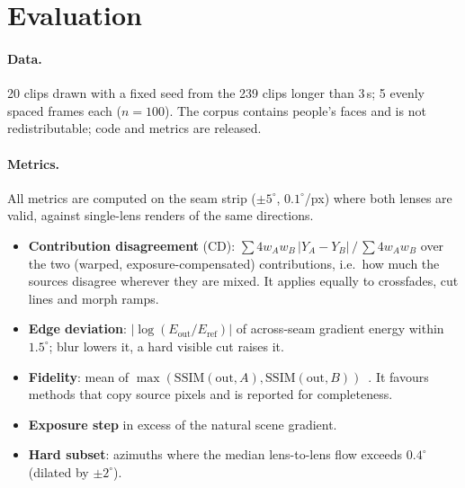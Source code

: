 \documentclass[11pt]{article}
\begin{document}
\section{Evaluation}\label{sec:eval}

\paragraph{Data.} 20 clips drawn with a fixed seed from the 239 clips longer than 3\,s; 5 evenly spaced frames each ($n=100$). The corpus contains people's faces and is not redistributable; code and metrics are released.

\paragraph{Metrics.} All metrics are computed on the seam strip ($\pm5^\circ$, $0.1^\circ$/px) where both lenses are valid, against single-lens renders of the same directions.
\begin{itemize}
\item \textbf{Contribution disagreement} (CD): $\sum 4w_Aw_B\,|Y_A-Y_B| \,/\, \sum 4w_Aw_B$ over the two (warped, exposure-compensated) contributions, i.e.\ how much the sources disagree wherever they are mixed. It applies equally to crossfades, cut lines and morph ramps.
\item \textbf{Edge deviation}: $|\log(E_\mathrm{out}/E_\mathrm{ref})|$ of across-seam gradient energy within $1.5^\circ$; blur lowers it, a hard visible cut raises it.
\item \textbf{Fidelity}: mean of $\max(\mathrm{SSIM}(\mathrm{out},A),\mathrm{SSIM}(\mathrm{out},B))$~\cite{wang2004ssim}. It favours methods that copy source pixels and is reported for completeness.
\item \textbf{Exposure step} in excess of the natural scene gradient.
\item \textbf{Hard subset}: azimuths where the median lens-to-lens flow exceeds $0.4^\circ$ (dilated by $\pm2^\circ$).
\end{itemize}
\end{document}
